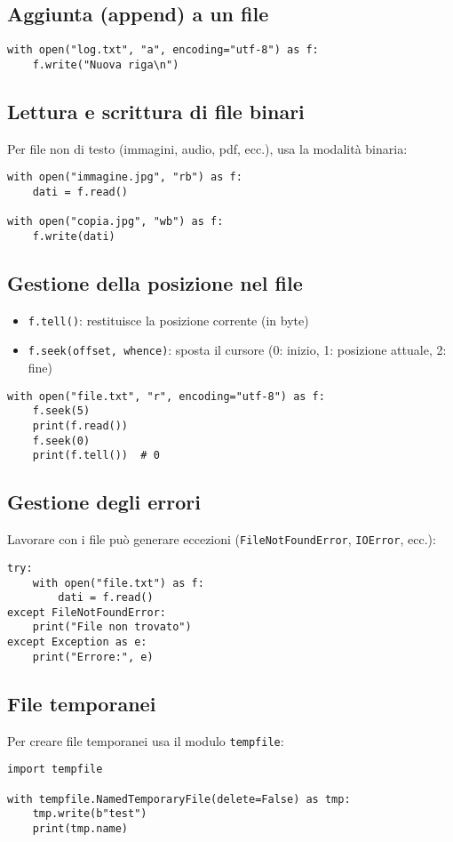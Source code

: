 \documentclass[a4paper,12pt]{article}
\begin{document}
\subsection*{Aggiunta (append) a un file}
\begin{lstlisting}
with open("log.txt", "a", encoding="utf-8") as f:
    f.write("Nuova riga\n")
\end{lstlisting}

\subsection*{Lettura e scrittura di file binari}
Per file non di testo (immagini, audio, pdf, ecc.), usa la modalità binaria:
\begin{lstlisting}
with open("immagine.jpg", "rb") as f:
    dati = f.read()

with open("copia.jpg", "wb") as f:
    f.write(dati)
\end{lstlisting}

\subsection*{Gestione della posizione nel file}
\begin{itemize}
    \item \texttt{f.tell()}: restituisce la posizione corrente (in byte)
    \item \texttt{f.seek(offset, whence)}: sposta il cursore (0: inizio, 1: posizione attuale, 2: fine)
\end{itemize}
\begin{lstlisting}
with open("file.txt", "r", encoding="utf-8") as f:
    f.seek(5)
    print(f.read())
    f.seek(0)
    print(f.tell())  # 0
\end{lstlisting}

\subsection*{Gestione degli errori}
Lavorare con i file può generare eccezioni (\texttt{FileNotFoundError}, \texttt{IOError}, ecc.):
\begin{lstlisting}
try:
    with open("file.txt") as f:
        dati = f.read()
except FileNotFoundError:
    print("File non trovato")
except Exception as e:
    print("Errore:", e)
\end{lstlisting}

\subsection*{File temporanei}
Per creare file temporanei usa il modulo \texttt{tempfile}:
\begin{lstlisting}
import tempfile

with tempfile.NamedTemporaryFile(delete=False) as tmp:
    tmp.write(b"test")
    print(tmp.name)
\end{lstlisting}
\end{document}
